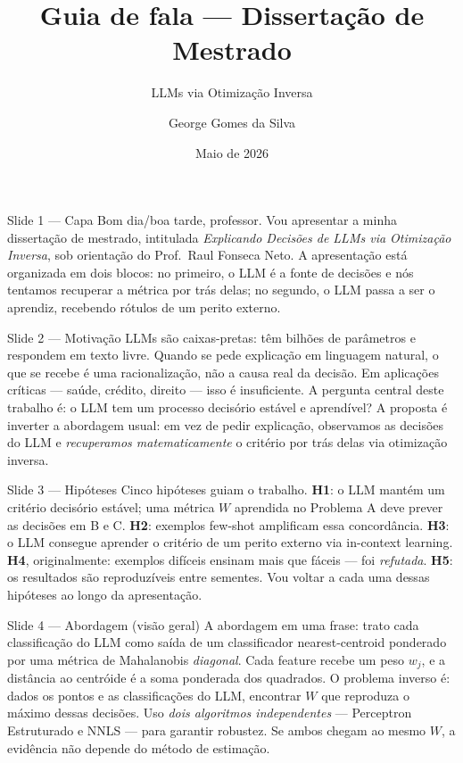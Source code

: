 \documentclass[aspectratio=169,10pt]{beamer}
\title[Guia de fala]{Guia de fala --- Disserta\c{c}\~ao de Mestrado}
\subtitle{LLMs via Otimiza\c{c}\~ao Inversa}
\author{George Gomes da Silva}
\date{Maio de 2026}
\begin{document}

\begin{frame}{Slide 1 --- Capa}
\footnotesize
Bom dia/boa tarde, professor. Vou apresentar a minha disserta\c{c}\~ao de mestrado, intitulada \emph{Explicando Decis\~oes de LLMs via Otimiza\c{c}\~ao Inversa}, sob orienta\c{c}\~ao do Prof.\ Raul Fonseca Neto. A apresenta\c{c}\~ao est\'a organizada em dois blocos: no primeiro, o LLM \'e a fonte de decis\~oes e n\'os tentamos recuperar a m\'etrica por tr\'as delas; no segundo, o LLM passa a ser o aprendiz, recebendo r\'otulos de um perito externo.
\end{frame}

\begin{frame}{Slide 2 --- Motiva\c{c}\~ao}
\footnotesize
LLMs s\~ao caixas-pretas: t\^em bilh\~oes de par\^ametros e respondem em texto livre. Quando se pede explica\c{c}\~ao em linguagem natural, o que se recebe \'e uma racionaliza\c{c}\~ao, n\~ao a causa real da decis\~ao. Em aplica\c{c}\~oes cr\'iticas --- sa\'ude, cr\'edito, direito --- isso \'e insuficiente. A pergunta central deste trabalho \'e: o LLM tem um processo decis\'orio est\'avel e aprend\'ivel? A proposta \'e inverter a abordagem usual: em vez de pedir explica\c{c}\~ao, observamos as decis\~oes do LLM e \emph{recuperamos matematicamente} o crit\'erio por tr\'as delas via otimiza\c{c}\~ao inversa.
\end{frame}

\begin{frame}{Slide 3 --- Hip\'oteses}
\footnotesize
Cinco hip\'oteses guiam o trabalho. \textbf{H1}: o LLM mant\'em um crit\'erio decis\'orio est\'avel; uma m\'etrica $W$ aprendida no Problema A deve prever as decis\~oes em B e C. \textbf{H2}: exemplos few-shot amplificam essa concord\^ancia. \textbf{H3}: o LLM consegue aprender o crit\'erio de um perito externo via in-context learning. \textbf{H4}, originalmente: exemplos dif\'iceis ensinam mais que f\'aceis --- foi \emph{refutada}. \textbf{H5}: os resultados s\~ao reproduz\'iveis entre sementes. Vou voltar a cada uma dessas hip\'oteses ao longo da apresenta\c{c}\~ao.
\end{frame}

\begin{frame}{Slide 4 --- Abordagem (vis\~ao geral)}
\footnotesize
A abordagem em uma frase: trato cada classifica\c{c}\~ao do LLM como sa\'ida de um classificador nearest-centroid ponderado por uma m\'etrica de Mahalanobis \emph{diagonal}. Cada feature recebe um peso $w_j$, e a dist\^ancia ao centr\'oide \'e a soma ponderada dos quadrados. O problema inverso \'e: dados os pontos e as classifica\c{c}\~oes do LLM, encontrar $W$ que reproduza o m\'aximo dessas decis\~oes. Uso \emph{dois algoritmos independentes} --- Perceptron Estruturado e NNLS --- para garantir robustez. Se ambos chegam ao mesmo $W$, a evid\^encia n\~ao depende do m\'etodo de estima\c{c}\~ao.
\end{frame}
\end{document}
